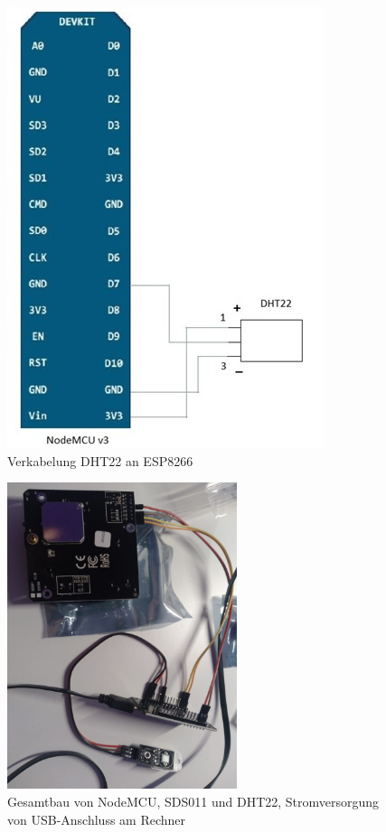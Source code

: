\documentclass[draft=false
              ,paper=a4
              ,twoside=false
              ,fontsize=10pt
              ,headsepline
              ,BCOR10mm
              ,DIV11
              ]{article}
\begin{document}
\begin{figure}[h!]
	\centering
	\includegraphics[width=0.6\linewidth]{DHT22anESP}
	\caption{Verkabelung DHT22 an ESP8266}
\end{figure}

\begin{figure}[h!]
  \includegraphics[width=0.6\textwidth, angle=90]{gesamt}
  \caption{Gesamtbau von NodeMCU, SDS011 und DHT22, Stromversorgung von USB-Anschluss am Rechner}
\end{figure}
\end{document}
